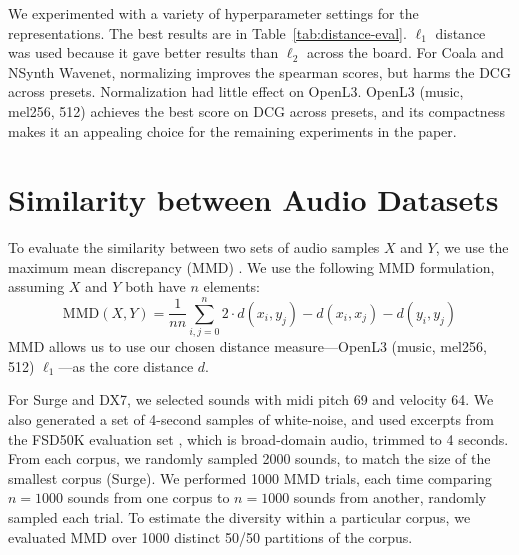 We experimented with a variety of hyperparameter settings for the representations. The best results are in Table~\ref{tab:distance-eval}. $\ell_1$ distance was used because it gave better results than $\ell_2$ across the board. For Coala and NSynth Wavenet, normalizing
improves the spearman scores, but harms the DCG across presets. Normalization had little effect on OpenL3. %
OpenL3 (music, mel256, 512) achieves the best score on DCG across presets, and its compactness makes it an appealing choice for the remaining experiments in the paper.

\section{Similarity between Audio Datasets}
\label{sec:similarity-dataset}

To evaluate the similarity between two sets of audio samples $X$ and $Y$, we use the maximum mean discrepancy (MMD) \cite{JMLR:v13:gretton12a}. We use the following MMD formulation, assuming $X$ and $Y$ both have $n$ elements:
\begin{equation}
    \textrm{MMD}(X, Y) = \frac{1}{n n} \sum_{i,j=0}^n 2 \cdot d(x_i, y_j) - d(x_i, x_j) - d(y_i, y_j)
  \label{eq:mmd}
\end{equation}
MMD allows us to use our chosen distance measure---OpenL3 (music, mel256, 512) $\ell_1$---as the core distance $d$.

For Surge and DX7, we selected sounds with midi pitch 69 and velocity 64. We also generated a set of 4-second samples of white-noise, and used excerpts from the FSD50K evaluation set \cite{fonseca2020fsd50k}, which is broad-domain audio, trimmed to 4 seconds. From each corpus, we randomly sampled 2000 sounds, to match the size of the smallest corpus (Surge). We performed 1000 MMD trials, each time comparing $n=1000$ sounds from one corpus to $n=1000$ sounds from another,  randomly sampled each trial. To estimate the diversity within a particular corpus, we evaluated MMD over 1000 distinct 50/50 partitions of the corpus.

